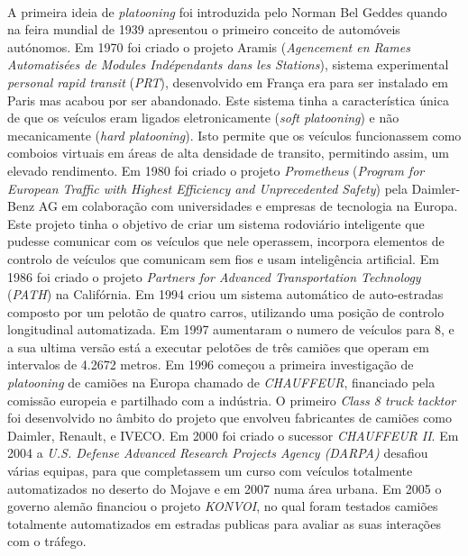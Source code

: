 \paragraph{}
A primeira ideia de \textit{platooning} foi introduzida pelo Norman Bel Geddes quando na feira mundial de 1939  apresentou o primeiro conceito de automóveis autónomos.
Em 1970 foi criado o projeto Aramis (\textit{Agencement en Rames Automatisées de Modules Indépendants dans les Stations}), sistema experimental \textit{personal rapid transit} (\textit{PRT}), desenvolvido em França era para ser instalado em Paris mas acabou por ser abandonado.  Este sistema tinha a característica única de que os veículos eram ligados eletronicamente (\textit{soft platooning}) e não mecanicamente (\textit{hard platooning}). Isto permite que os veículos funcionassem como comboios virtuais em áreas de alta densidade de transito, permitindo assim, um elevado rendimento.
Em 1980 foi criado o projeto \textit{Prometheus} (\textit{Program for European Traffic with Highest Efficiency and Unprecedented Safety}) pela Daimler-Benz AG em colaboração com universidades e empresas  de tecnologia na Europa. Este projeto tinha o objetivo de criar um sistema rodoviário inteligente que pudesse comunicar com os veículos que nele operassem, incorpora elementos de controlo de veículos que comunicam sem fios e usam inteligência artificial.
Em 1986 foi criado o projeto \textit{Partners for Advanced Transportation Technology} (\textit{PATH}) na Califórnia. Em 1994 criou um sistema automático de auto-estradas composto por um pelotão de quatro carros, utilizando uma posição de controlo longitudinal automatizada. Em 1997 aumentaram o numero de veículos para 8, e a sua ultima versão está a executar pelotões de três camiões que operam em intervalos de 4.2672 metros.
Em 1996 começou a primeira investigação de \textit{platooning} de camiões na Europa chamado de \textit{CHAUFFEUR}, financiado pela comissão europeia e partilhado com a indústria. O primeiro \textit{Class 8 truck tacktor} foi desenvolvido no âmbito do projeto que envolveu fabricantes de camiões como Daimler, Renault, e IVECO. Em 2000 foi criado o sucessor \textit{CHAUFFEUR II}.
Em 2004 a \textit{U.S. Defense Advanced Research Projects Agency (DARPA)} desafiou várias equipas, para que completassem um curso com veículos totalmente automatizados no deserto do Mojave e em 2007 numa área urbana.
Em 2005 o governo alemão financiou o projeto \textit{KONVOI}, no qual foram testados camiões totalmente automatizados em estradas publicas para avaliar as suas interações com o tráfego.
